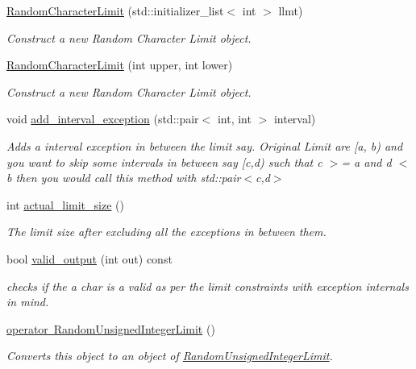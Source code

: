 \begin{DoxyCompactItemize}
\item 
\mbox{\hyperlink{classtestcaser_1_1maker_1_1RandomCharacterLimit_a2ebd894bf7f536219bf7a917ed036c55}{Random\+Character\+Limit}} (std\+::initializer\+\_\+list$<$ int $>$ llmt)
\begin{DoxyCompactList}\small\item\em Construct a new Random Character Limit object. \end{DoxyCompactList}\item 
\mbox{\hyperlink{classtestcaser_1_1maker_1_1RandomCharacterLimit_a7a85c6420ec09f97e648f516a9bb68fd}{Random\+Character\+Limit}} (int upper, int lower)
\begin{DoxyCompactList}\small\item\em Construct a new Random Character Limit object. \end{DoxyCompactList}\item 
void \mbox{\hyperlink{classtestcaser_1_1maker_1_1RandomCharacterLimit_a9fac35205a15685a2ce671f9f38279ab}{add\+\_\+interval\+\_\+exception}} (std\+::pair$<$ int, int $>$ interval)
\begin{DoxyCompactList}\small\item\em Adds a interval exception in between the limit say. Original Limit are \mbox{[}a, b) and you want to skip some intervals in between say \mbox{[}c,d) such that c $>$= a and d $<$ b then you would call this method with std\+::pair$<$c,d$>$ \end{DoxyCompactList}\item 
int \mbox{\hyperlink{classtestcaser_1_1maker_1_1RandomCharacterLimit_a912c757f9c26f6ba3e3ec18db3c904c5}{actual\+\_\+limit\+\_\+size}} ()
\begin{DoxyCompactList}\small\item\em The limit size after excluding all the exceptions in between them. \end{DoxyCompactList}\item 
bool \mbox{\hyperlink{classtestcaser_1_1maker_1_1RandomCharacterLimit_a1b3f0a14a18aa307cf4a82f834393928}{valid\+\_\+output}} (int out) const
\begin{DoxyCompactList}\small\item\em checks if the a char is a valid as per the limit constraints with exception internals in mind. \end{DoxyCompactList}\item 
\mbox{\hyperlink{classtestcaser_1_1maker_1_1RandomCharacterLimit_a230a33b5d028fdef4a027f7c96663d32}{operator Random\+Unsigned\+Integer\+Limit}} ()
\begin{DoxyCompactList}\small\item\em Converts this object to an object of \mbox{\hyperlink{classtestcaser_1_1maker_1_1RandomUnsignedIntegerLimit}{Random\+Unsigned\+Integer\+Limit}}. \end{DoxyCompactList}\end{DoxyCompactItemize}
